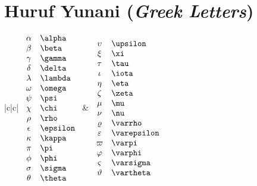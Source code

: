 \section{Huruf Yunani (\textit{Greek Letters})}
\label{sec:greek}
\begin{table}[htbp]
\centering
\begin{tabular}{|c|c|} \hline
\( \begin{array}{cl}
\alpha & \verb+\alpha+ \\
\beta & \verb+\beta+ \\
\gamma & \verb+\gamma+ \\
\delta & \verb+\delta+ \\
\lambda & \verb+\lambda+ \\
\omega & \verb+\omega+ \\
\psi & \verb+\psi+ \\
\chi & \verb+\chi+ \\
\rho  & \verb+\rho + \\
\epsilon & \verb+\epsilon+ \\
\kappa & \verb+\kappa+ \\
\pi & \verb+\pi+ \\
\phi & \verb+\phi+ \\
\sigma & \verb+\sigma+ \\
\theta & \verb+\theta+ \\
\end{array} \)
&
\( \begin{array}{cl}
\upsilon & \verb+\upsilon+ \\
\xi & \verb+\xi+ \\
\tau & \verb+\tau+ \\
\iota & \verb+\iota+ \\
\eta & \verb+\eta+ \\
\zeta & \verb+\zeta+ \\
\mu& \verb+\mu+ \\
\nu & \verb+\nu+ \\
\varrho & \verb+\varrho+ \\
\varepsilon & \verb+\varepsilon+ \\
\varpi & \verb+\varpi+ \\
\varphi & \verb+\varphi+ \\
\varsigma & \verb+\varsigma+ \\
\vartheta & \verb+\vartheta+ 
\end{array} \)
\\ \hline
\end{tabular}
\end{table}

